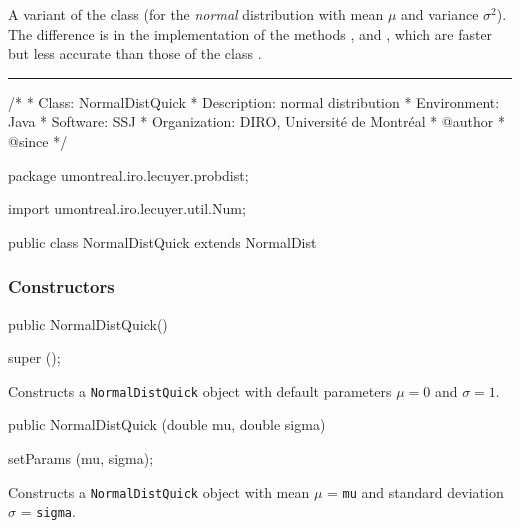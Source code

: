 
A variant of the class  (for the {\em normal\/} 
distribution with mean $\mu$ and variance $\sigma^2$).
The difference is in the implementation of the methods ,
 and , which are faster
but less accurate than those of the class . 
 

\bigskip\hrule

\begin{code}
\begin{hide}
/*
 * Class:        NormalDistQuick
 * Description:  normal distribution
 * Environment:  Java
 * Software:     SSJ 
 * Organization: DIRO, Université de Montréal
 * @author       
 * @since
 */
\end{hide}
package umontreal.iro.lecuyer.probdist;\begin{hide}
import umontreal.iro.lecuyer.util.Num;\end{hide}

public class NormalDistQuick extends NormalDist \begin{hide} {
\end{hide}
\end{code}
\subsubsection* {Constructors}

\begin{code}

   public NormalDistQuick()\begin{hide} {
      super ();
   }\end{hide}
\end{code}
 \begin{tabb}
 Constructs a \texttt{NormalDistQuick} object with default parameters $\mu = 0$ 
 and $\sigma = 1$.   
 \end{tabb}
\begin{code}

   public NormalDistQuick (double mu, double sigma)\begin{hide} {
      setParams (mu, sigma);
   }\end{hide}
\end{code}
\begin{tabb}
 Constructs a \texttt{NormalDistQuick} object with mean $\mu$ = \texttt{mu} 
 and  standard deviation $\sigma$ = \texttt{sigma}.   
 \end{tabb}

